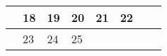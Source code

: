 {\begin{tabularx}{\linewidth}{|l!{\vrule width \myLenLineThicknessThick}*{7}{@{}X@{}|}}
       & 
    
      
      
        \begin{minipage}[t]{6mm}\centering{}18\end{minipage}
      
       & 
    
      
      
        \begin{minipage}[t]{6mm}\centering{}19\end{minipage}
      
       & 
    
      
      
        \begin{minipage}[t]{6mm}\centering{}20\end{minipage}
      
       & 
    
      
      
        \begin{minipage}[t]{6mm}\centering{}21\end{minipage}
      
       & 
    
      
      
        \begin{minipage}[t]{6mm}\centering{}22\end{minipage}
      
      
        \\  \hline 
      
    
  
  
  
  \hyperlink{week-2026-12}{} &
    
      
      
        \begin{minipage}[t]{6mm}\centering{}23\end{minipage}
      
       & 
    
      
      
        \begin{minipage}[t]{6mm}\centering{}24\end{minipage}
      
       & 
    
      
      
        \begin{minipage}[t]{6mm}\centering{}25\end{minipage}
      

\end{tabularx}}
